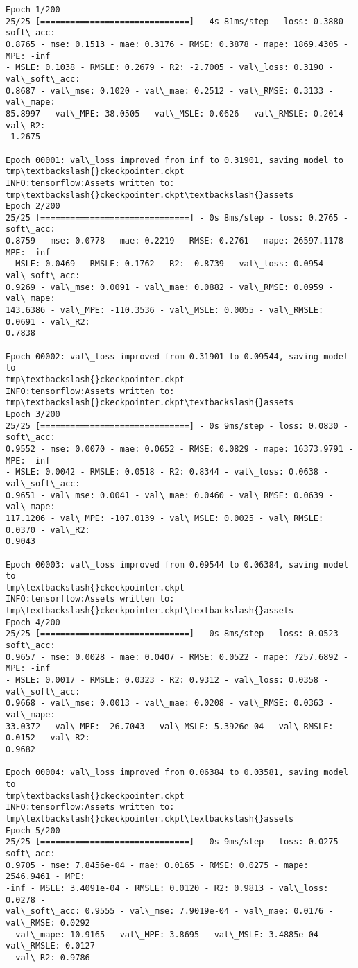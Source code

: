 \documentclass[11pt]{article}
\begin{document}
    \begin{Verbatim}[commandchars=\\\{\}]
Epoch 1/200
25/25 [==============================] - 4s 81ms/step - loss: 0.3880 - soft\_acc:
0.8765 - mse: 0.1513 - mae: 0.3176 - RMSE: 0.3878 - mape: 1869.4305 - MPE: -inf
- MSLE: 0.1038 - RMSLE: 0.2679 - R2: -2.7005 - val\_loss: 0.3190 - val\_soft\_acc:
0.8687 - val\_mse: 0.1020 - val\_mae: 0.2512 - val\_RMSE: 0.3133 - val\_mape:
85.8997 - val\_MPE: 38.0505 - val\_MSLE: 0.0626 - val\_RMSLE: 0.2014 - val\_R2:
-1.2675

Epoch 00001: val\_loss improved from inf to 0.31901, saving model to
tmp\textbackslash{}ckeckpointer.ckpt
INFO:tensorflow:Assets written to: tmp\textbackslash{}ckeckpointer.ckpt\textbackslash{}assets
Epoch 2/200
25/25 [==============================] - 0s 8ms/step - loss: 0.2765 - soft\_acc:
0.8759 - mse: 0.0778 - mae: 0.2219 - RMSE: 0.2761 - mape: 26597.1178 - MPE: -inf
- MSLE: 0.0469 - RMSLE: 0.1762 - R2: -0.8739 - val\_loss: 0.0954 - val\_soft\_acc:
0.9269 - val\_mse: 0.0091 - val\_mae: 0.0882 - val\_RMSE: 0.0959 - val\_mape:
143.6386 - val\_MPE: -110.3536 - val\_MSLE: 0.0055 - val\_RMSLE: 0.0691 - val\_R2:
0.7838

Epoch 00002: val\_loss improved from 0.31901 to 0.09544, saving model to
tmp\textbackslash{}ckeckpointer.ckpt
INFO:tensorflow:Assets written to: tmp\textbackslash{}ckeckpointer.ckpt\textbackslash{}assets
Epoch 3/200
25/25 [==============================] - 0s 9ms/step - loss: 0.0830 - soft\_acc:
0.9552 - mse: 0.0070 - mae: 0.0652 - RMSE: 0.0829 - mape: 16373.9791 - MPE: -inf
- MSLE: 0.0042 - RMSLE: 0.0518 - R2: 0.8344 - val\_loss: 0.0638 - val\_soft\_acc:
0.9651 - val\_mse: 0.0041 - val\_mae: 0.0460 - val\_RMSE: 0.0639 - val\_mape:
117.1206 - val\_MPE: -107.0139 - val\_MSLE: 0.0025 - val\_RMSLE: 0.0370 - val\_R2:
0.9043

Epoch 00003: val\_loss improved from 0.09544 to 0.06384, saving model to
tmp\textbackslash{}ckeckpointer.ckpt
INFO:tensorflow:Assets written to: tmp\textbackslash{}ckeckpointer.ckpt\textbackslash{}assets
Epoch 4/200
25/25 [==============================] - 0s 8ms/step - loss: 0.0523 - soft\_acc:
0.9657 - mse: 0.0028 - mae: 0.0407 - RMSE: 0.0522 - mape: 7257.6892 - MPE: -inf
- MSLE: 0.0017 - RMSLE: 0.0323 - R2: 0.9312 - val\_loss: 0.0358 - val\_soft\_acc:
0.9668 - val\_mse: 0.0013 - val\_mae: 0.0208 - val\_RMSE: 0.0363 - val\_mape:
33.0372 - val\_MPE: -26.7043 - val\_MSLE: 5.3926e-04 - val\_RMSLE: 0.0152 - val\_R2:
0.9682

Epoch 00004: val\_loss improved from 0.06384 to 0.03581, saving model to
tmp\textbackslash{}ckeckpointer.ckpt
INFO:tensorflow:Assets written to: tmp\textbackslash{}ckeckpointer.ckpt\textbackslash{}assets
Epoch 5/200
25/25 [==============================] - 0s 9ms/step - loss: 0.0275 - soft\_acc:
0.9705 - mse: 7.8456e-04 - mae: 0.0165 - RMSE: 0.0275 - mape: 2546.9461 - MPE:
-inf - MSLE: 3.4091e-04 - RMSLE: 0.0120 - R2: 0.9813 - val\_loss: 0.0278 -
val\_soft\_acc: 0.9555 - val\_mse: 7.9019e-04 - val\_mae: 0.0176 - val\_RMSE: 0.0292
- val\_mape: 10.9165 - val\_MPE: 3.8695 - val\_MSLE: 3.4885e-04 - val\_RMSLE: 0.0127
- val\_R2: 0.9786


\end{Verbatim}
\end{document}

